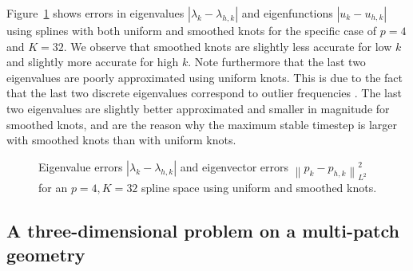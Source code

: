 \documentclass[preprint,10pt]{elsarticle}
\newcommand{\nor}[1]{\left\| #1 \right\|}
\newcommand{\LRb}[1]{\left| #1 \right|}
\begin{document}
Figure~\ref{fig:eigerr2} shows errors in eigenvalues $\LRb{\lambda_k-\lambda_{h,k}}$ { and eigenfunctions $\LRb{u_k-u_{h,k}}$} using splines with both uniform and smoothed knots { for the specific case of $p = 4$ and $K = 32$}.  We observe that smoothed knots are slightly less accurate for low $k$ and slightly more accurate for high $k$.  { Note furthermore that the last two eigenvalues are poorly approximated using uniform knots.  This is due to the fact that the last two discrete eigenvalues correspond to outlier frequencies \cite{hughes2008duality}.  The last two eigenvalues are slightly better approximated and smaller in magnitude for smoothed knots, and are the reason why the maximum stable timestep is larger with smoothed knots than with uniform knots.  
}
\begin{figure}
\centering
{}
\caption{Eigenvalue errors $\LRb{\lambda_k-\lambda_{h,k}}$ and eigenvector errors $\nor{p_k-p_{h,k}}_{L^2}^2$ for an $p = 4, K = 32$ spline space using uniform and smoothed knots.  }
\label{fig:eigerr2}
\end{figure}

\subsection{A three-dimensional problem on a multi-patch geometry}
\end{document}
